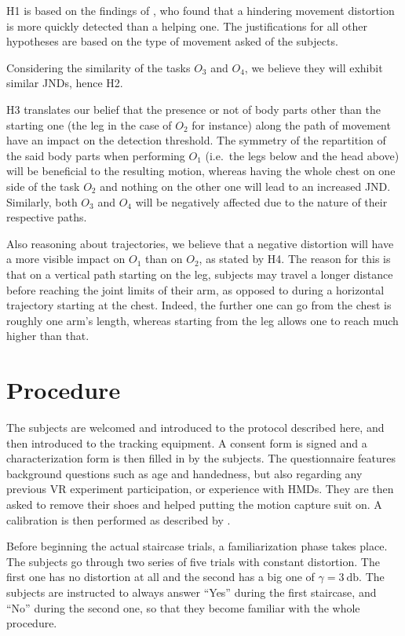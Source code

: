 H1 is based on the findings of \cite{debarba2017embodiment}, who found that a hindering movement distortion is more quickly detected than a helping one. The justifications for all other hypotheses are based on the type of movement asked of the subjects.

Considering the similarity of the tasks $O_3$ and $O_4$, we believe they will exhibit similar JNDs, hence H2.

H3 translates our belief that the presence or not of body parts other than the starting one (the leg in the case of $O_2$ for instance) along the path of movement have an impact on the detection threshold. The symmetry of the repartition of the said body parts when performing $O_1$ (i.e.\ the legs below and the head above) will be beneficial to the resulting motion, whereas having the whole chest on one side of the task $O_2$ and nothing on the other one will lead to an increased JND. Similarly, both $O_3$ and $O_4$ will be negatively affected due to the nature of their respective paths. \cite{burns2007macbeth}

Also reasoning about trajectories, we believe that a negative distortion will have a more visible impact on $O_1$ than on $O_2$, as stated by H4. The reason for this is that on a vertical path starting on the leg, subjects may travel a longer distance before reaching the joint limits of their arm, as opposed to during a horizontal trajectory starting at the chest. Indeed, the further one can go from the chest is roughly one arm's length, whereas starting from the leg allows one to reach much higher than that.

\section{Procedure}

The subjects are welcomed and introduced to the protocol described here, and then introduced to the tracking equipment. A consent form is signed and a characterization form is then filled in by the subjects. The questionnaire features background questions such as age and handedness, but also regarding any previous VR experiment participation, or experience with HMDs. They are then asked to remove their shoes and helped putting the motion capture suit on. A calibration is then performed as described by \cite{molla2017egocentric}.

Before beginning the actual staircase trials, a familiarization phase takes place. The subjects go through two series of five trials with constant distortion. The first one has no distortion at all and the second has a big one of $\gamma = \SI{3}{\decibel}$. The subjects are instructed to always answer ``Yes'' during the first staircase, and ``No'' during the second one, so that they become familiar with the whole procedure.

